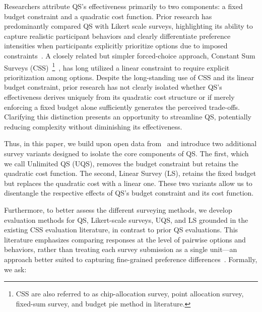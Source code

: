 Researchers attribute QS's effectiveness primarily to two components: a fixed budget constraint and a quadratic cost function. Prior research has predominantly compared QS with Likert scale surveys, highlighting its ability to capture realistic participant behaviors and clearly differentiate preference intensities when participants explicitly prioritize options due to imposed constraints~\cite{chengCanShowWhat2021, cavaille2024cares}. A closely related but simpler forced-choice approach, Constant Sum Surveys (CSS)~\footnote{CSS are also referred to as chip-allocation survey, point allocation survey, fixed-sum survey, and budget pie method in literature.}~\cite{metfesselProposalQuantitativeReporting1947}, has long utilized a linear constraint to require explicit prioritization among options. Despite the long-standing use of CSS and its linear budget constraint, prior research has not clearly isolated whether QS's effectiveness derives uniquely from its quadratic cost structure or if merely enforcing a fixed budget alone sufficiently generates the perceived trade-offs. Clarifying this distinction presents an opportunity to streamline QS, potentially reducing complexity without diminishing its effectiveness.


Thus, in this paper, we build upon open data from~\citet{illinoisdatabankIDB-1928463} and introduce two additional survey variants designed to isolate the core components of QS. The first, which we call Unlimited QS (UQS), removes the budget constraint but retains the quadratic cost function. The second, Linear Survey (LS), retains the fixed budget but replaces the quadratic cost with a linear one. These two variants allow us to disentangle the respective effects of QS's budget constraint and its cost function.

Furthermore, to better assess the different surveying methods, we develop evaluation methods for QS, Likert-scale surveys, UQS, and LS grounded in the existing CSS evaluation literature, in contrast to prior QS evaluations. This literature emphasizes comparing responses at the level of pairwise options and behaviors, rather than treating each survey submission as a single unit—an approach better suited to capturing fine-grained preference differences~\cite{collewet2023preference, }. Formally, we ask:

